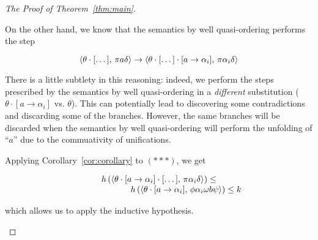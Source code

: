 \begin{proof}[The Proof of Theorem~\ref{thm:main}]
\begin{enumerate}
    On the other hand, we know that the semantics by well quasi-ordering performs the step

    \[
    \langle \theta\cdot[\dots],\,\pi a \delta \rangle\to\langle \theta\cdot[\dots]\cdot[a\to\alpha_i],\,\pi \alpha_i \delta \rangle
    \]

    There is a little subtlety in this reasoning: indeed, we perform the steps prescribed by the semantics
    by well quasi-ordering in a \emph{different} substitution ($\theta\cdot[a\to\alpha_i]$ vs. $\theta$). This
    can potentially lead to discovering some contradictions and discarding some of the branches. However, the same
    branches will be discarded when the semantics by well quasi-ordering will perform the unfolding of ``$a$''
    due to the commuativity of unifications.

    Applying Corollary~\ref{cor:corollary} to $(***)$, we get

    \[
    \begin{array}{c}
      h\,(\langle \theta\cdot[a\to\alpha_i]\cdot[\dots],\,\pi\alpha_i\delta \rangle)\le \\
      \phantom{XXXXXXX}h\,(\langle \theta\cdot[a\to\alpha_i],\,\phi \alpha_i \omega b \psi \rangle) \le k
    \end{array}
    \]

    which allows us to apply the inductive hypothesis.
  \end{enumerate}  
  
\end{proof}
